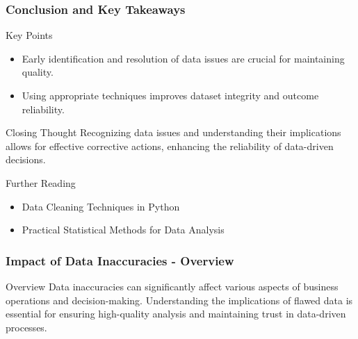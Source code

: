 \documentclass{beamer}
\begin{document}
\begin{frame}[fragile]
    \frametitle{Conclusion and Key Takeaways}
    \begin{block}{Key Points}
        \begin{itemize}
            \item Early identification and resolution of data issues are crucial for maintaining quality.
            \item Using appropriate techniques improves dataset integrity and outcome reliability.
        \end{itemize}
    \end{block}
    \begin{block}{Closing Thought}
        Recognizing data issues and understanding their implications allows for effective corrective actions, enhancing the reliability of data-driven decisions.
    \end{block}
    \begin{block}{Further Reading}
        \begin{itemize}
            \item Data Cleaning Techniques in Python
            \item Practical Statistical Methods for Data Analysis
        \end{itemize}
    \end{block}
\end{frame}

\begin{frame}[fragile]
    \frametitle{Impact of Data Inaccuracies - Overview}
    \begin{block}{Overview}
        Data inaccuracies can significantly affect various aspects of business operations and decision-making. 
        Understanding the implications of flawed data is essential for ensuring high-quality analysis and maintaining trust in data-driven processes.
    \end{block}
\end{frame}
\end{document}
